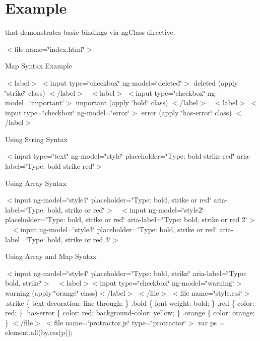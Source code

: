 \hypertarget{_example-example}{}\section{Example}
that demonstrates basic bindings via ng\+Class directive. 

$<$file name=\char`\"{}index.\+html\char`\"{}$>$ 

Map Syntax Example

$<$label$>$ $<$input type=\char`\"{}checkbox\char`\"{} ng-\/model=\char`\"{}deleted\char`\"{}$>$ deleted (apply \char`\"{}strike\char`\"{} class) $<$/label$>$~\newline
 $<$label$>$ $<$input type=\char`\"{}checkbox\char`\"{} ng-\/model=\char`\"{}important\char`\"{}$>$ important (apply \char`\"{}bold\char`\"{} class) $<$/label$>$~\newline
 $<$label$>$ $<$input type=\char`\"{}checkbox\char`\"{} ng-\/model=\char`\"{}error\char`\"{}$>$ error (apply \char`\"{}has-\/error\char`\"{} class) $<$/label$>$ 

 

Using String Syntax

$<$input type=\char`\"{}text\char`\"{} ng-\/model=\char`\"{}style\char`\"{} placeholder=\char`\"{}\+Type\+: bold strike red\char`\"{} aria-\/label=\char`\"{}\+Type\+: bold strike red\char`\"{}$>$ 

 

Using Array Syntax

$<$input ng-\/model=\char`\"{}style1\char`\"{} placeholder=\char`\"{}\+Type\+: bold, strike or red\char`\"{} aria-\/label=\char`\"{}\+Type\+: bold, strike or red\char`\"{}$>$~\newline
 $<$input ng-\/model=\char`\"{}style2\char`\"{} placeholder=\char`\"{}\+Type\+: bold, strike or red\char`\"{} aria-\/label=\char`\"{}\+Type\+: bold, strike or red 2\char`\"{}$>$~\newline
 $<$input ng-\/model=\char`\"{}style3\char`\"{} placeholder=\char`\"{}\+Type\+: bold, strike or red\char`\"{} aria-\/label=\char`\"{}\+Type\+: bold, strike or red 3\char`\"{}$>$~\newline
 

 

Using Array and Map Syntax

$<$input ng-\/model=\char`\"{}style4\char`\"{} placeholder=\char`\"{}\+Type\+: bold, strike\char`\"{} aria-\/label=\char`\"{}\+Type\+: bold, strike\char`\"{}$>$~\newline
 $<$label$>$$<$input type=\char`\"{}checkbox\char`\"{} ng-\/model=\char`\"{}warning\char`\"{}$>$ warning (apply \char`\"{}orange\char`\"{} class)$<$/label$>$ $<$/file$>$ $<$file name=\char`\"{}style.\+css\char`\"{}$>$ .strike \{ text-\/decoration\+: line-\/through; \} .bold \{ font-\/weight\+: bold; \} .red \{ color\+: red; \} .has-\/error \{ color\+: red; background-\/color\+: yellow; \} .orange \{ color\+: orange; \} $<$/file$>$ $<$file name=\char`\"{}protractor.\+js\char`\"{} type=\char`\"{}protractor\char`\"{}$>$ var ps = element.\+all(by.\+css(\textquotesingle{}p\textquotesingle{}));

